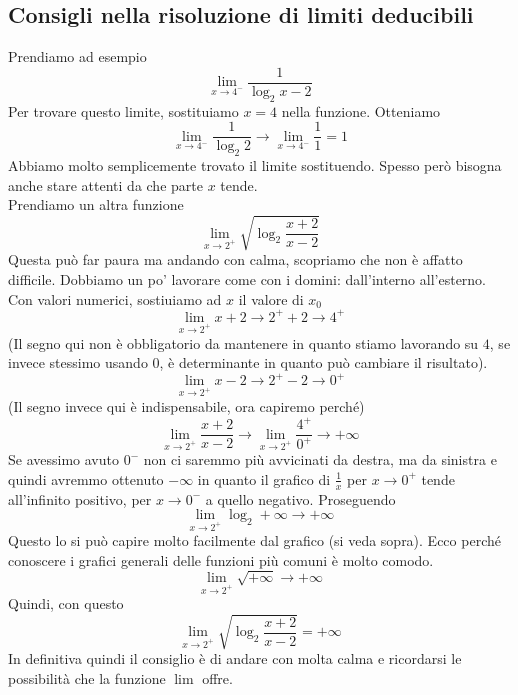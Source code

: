 \subsection{Consigli nella risoluzione di limiti deducibili}
Prendiamo ad esempio
\begin{equation*}
\lim\limits_{x\to4^-}\frac{1}{\log_2 x -2}
\end{equation*}
Per trovare questo limite, sostituiamo $x = 4$ nella funzione. Otteniamo
\begin{equation*}
\lim\limits_{x\to4^-}\frac{1}{\log_2 2} \to \lim\limits_{x\to4^-}\frac{1}{1} = 1
\end{equation*}
Abbiamo molto semplicemente trovato il limite sostituendo. Spesso però bisogna anche stare attenti 
da che parte $x$ tende.\\[\baselineskip]
Prendiamo un altra funzione
\begin{equation*}
\lim\limits_{x\to2^+}\sqrt{\log_2\frac{x+2}{x-2}}
\end{equation*}
Questa può far paura ma andando con calma, scopriamo che non è affatto difficile. Dobbiamo un po'
lavorare come con i domini: dall'interno all'esterno. Con valori numerici, sostiuiamo ad $x$ il valore
di $x_0$
\begin{equation*}
\lim\limits_{x\to2^+}x+2 \to 2^++2 \to 4^+
\end{equation*}
(Il segno qui non è obbligatorio da mantenere in quanto stiamo lavorando su $4$, se invece stessimo
usando $0$, è determinante in quanto può cambiare il risultato).
\begin{equation*}
\lim\limits_{x\to2^+}x-2 \to 2^+-2 \to 0^+
\end{equation*}
(Il segno invece qui è indispensabile, ora capiremo perché)
\begin{equation*}
\lim\limits_{x\to2^+}\frac{x+2}{x-2}\to\lim\limits_{x\to2^+}\frac{4^+}{0^+}\to+\infty
\end{equation*}
Se avessimo avuto $0^-$ non ci saremmo più avvicinati da destra, ma da sinistra e quindi avremmo 
ottenuto $-\infty$ in quanto il grafico di $\frac{1}{x}$ per $x\to 0^+$ tende all'infinito positivo,
per $x\to0^-$ a quello negativo. Proseguendo
\begin{equation*}
\lim\limits_{x\to2^+}\log_2 +\infty \to +\infty
\end{equation*}
Questo lo si può capire molto facilmente dal grafico (si veda sopra). Ecco perché conoscere i grafici
generali delle funzioni più comuni è molto comodo.
\begin{equation*}
\lim\limits_{x\to2^+}\sqrt{+\infty}\to+\infty
\end{equation*}
Quindi, con questo
\begin{equation*}
\lim\limits_{x\to2^+}\sqrt{\log_2\frac{x+2}{x-2}} = +\infty
\end{equation*}
In definitiva quindi il consiglio è di andare con molta calma e ricordarsi le possibilità che la
funzione $\lim$ offre.

